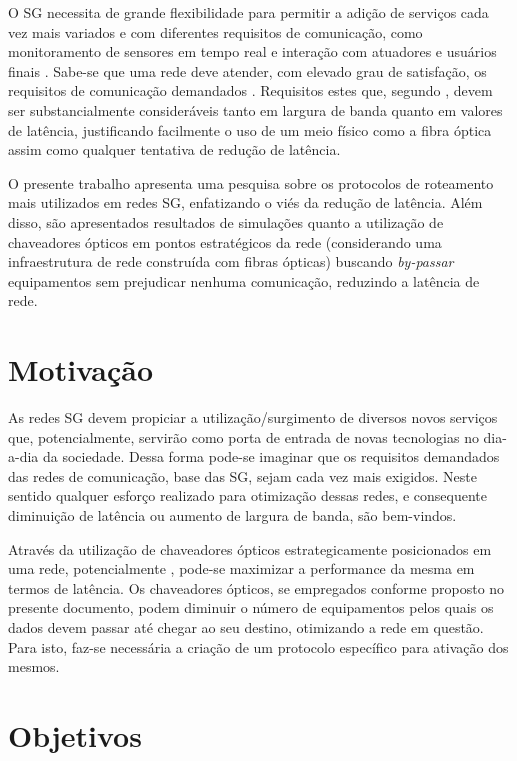 O SG necessita de grande flexibilidade para permitir a adição de serviços cada vez mais variados e com diferentes requisitos de comunicação, como monitoramento de sensores em tempo real e interação com atuadores e usuários finais \cite{Art_Aggarwal2010}. Sabe-se que uma rede  deve atender, com elevado grau de satisfação, os requisitos de comunicação demandados \cite{Conf_Lobo2008}. Requisitos estes que, segundo \cite{Art_Aggarwal2010}, devem ser substancialmente consideráveis tanto em largura de banda quanto em valores de latência, justificando facilmente o uso de um meio físico como a fibra óptica assim como qualquer tentativa de redução de latência. 

O presente trabalho apresenta uma pesquisa sobre os protocolos de roteamento mais utilizados em redes SG, enfatizando o viés da redução de latência. Além disso, são apresentados resultados de simulações quanto a utilização de chaveadores ópticos em pontos estratégicos da rede (considerando uma infraestrutura de rede construída com fibras ópticas) buscando \emph{by-passar} equipamentos sem prejudicar nenhuma comunicação, reduzindo a latência de rede.

\section{Motivação}
As redes SG devem propiciar a utilização/surgimento de diversos novos serviços que, potencialmente, servirão como porta de entrada de novas tecnologias no dia-a-dia da sociedade. Dessa forma pode-se imaginar que os requisitos demandados das redes de comunicação, base das SG, sejam cada vez mais exigidos. Neste sentido qualquer esforço realizado para otimização dessas redes, e consequente diminuição de latência ou aumento de largura de banda, são bem-vindos.

Através da utilização de chaveadores ópticos estrategicamente posicionados em uma rede, potencialmente , pode-se maximizar a performance da mesma em termos de latência. Os chaveadores ópticos, se empregados conforme proposto no presente documento, podem diminuir o número de equipamentos pelos quais os dados devem passar até chegar ao seu destino, otimizando a rede em questão. Para isto, faz-se necessária a criação de um protocolo específico para ativação dos mesmos.

\section{Objetivos}

